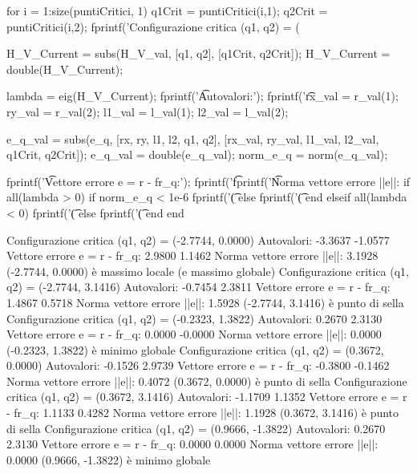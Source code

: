 \documentclass[11pt, a4paper]{article}
\begin{document}
\begin{matlabcode}
for i = 1:size(puntiCritici, 1)
    q1Crit = puntiCritici(i,1);
    q2Crit = puntiCritici(i,2);
    fprintf('Configurazione critica (q1, q2) = (%

    H_V_Current = subs(H_V_val, [q1, q2], [q1Crit, q2Crit]);
    H_V_Current = double(H_V_Current);

    lambda = eig(H_V_Current);
    fprintf('\t Autovalori:\n');
    fprintf('\t %

    rx_val = r_val(1);
    ry_val = r_val(2);
    l1_val = l_val(1);
    l2_val = l_val(2);

    e_q_val = subs(e_q, [rx, ry, l1, l2, q1, q2], [rx_val, ry_val, l1_val, l2_val, q1Crit, q2Crit]);
    e_q_val = double(e_q_val);
    norm_e_q = norm(e_q_val);

    fprintf('\t Vettore errore e = r - fr_q:\n');
    fprintf('\t %
    fprintf('\t Norma vettore errore ||e||: %
    if all(lambda > 0)
        if norm_e_q < 1e-6
            fprintf('\t (%
        else
            fprintf('\t (%
        end
    elseif all(lambda < 0)
        fprintf('\t (%
    else
        fprintf('\t (%
    end
end
\end{matlabcode}
\begin{matlaboutput}
Configurazione critica (q1, q2) = (-2.7744, 0.0000)
	 Autovalori:
	 -3.3637
	 -1.0577
	 Vettore errore e = r - fr_q:
	 2.9800
	 1.1462
	 Norma vettore errore ||e||: 3.1928
	 (-2.7744, 0.0000) è massimo locale (e massimo globale)
Configurazione critica (q1, q2) = (-2.7744, 3.1416)
	 Autovalori:
	 -0.7454
	 2.3811
	 Vettore errore e = r - fr_q:
	 1.4867
	 0.5718
	 Norma vettore errore ||e||: 1.5928
	 (-2.7744, 3.1416) è punto di sella
Configurazione critica (q1, q2) = (-0.2323, 1.3822)
	 Autovalori:
	 0.2670
	 2.3130
	 Vettore errore e = r - fr_q:
	 0.0000
	 -0.0000
	 Norma vettore errore ||e||: 0.0000
	 (-0.2323, 1.3822) è minimo globale
Configurazione critica (q1, q2) = (0.3672, 0.0000)
	 Autovalori:
	 -0.1526
	 2.9739
	 Vettore errore e = r - fr_q:
	 -0.3800
	 -0.1462
	 Norma vettore errore ||e||: 0.4072
	 (0.3672, 0.0000) è punto di sella
Configurazione critica (q1, q2) = (0.3672, 3.1416)
	 Autovalori:
	 -1.1709
	 1.1352
	 Vettore errore e = r - fr_q:
	 1.1133
	 0.4282
	 Norma vettore errore ||e||: 1.1928
	 (0.3672, 3.1416) è punto di sella
Configurazione critica (q1, q2) = (0.9666, -1.3822)
	 Autovalori:
	 0.2670
	 2.3130
	 Vettore errore e = r - fr_q:
	 0.0000
	 0.0000
	 Norma vettore errore ||e||: 0.0000
	 (0.9666, -1.3822) è minimo globale
\end{matlaboutput}
\end{document}
